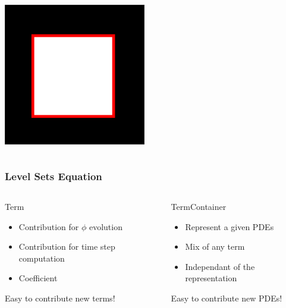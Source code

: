 \begin{frame}
\begin{columns}
{\begin{center}
 \includegraphics[width=0.8\textwidth]{../Art/MalcolmLayers.png}
\end{center}
}

\end{columns}

\end{frame}


\begin{frame}
\frametitle{Level Sets Equation}

\begin{columns}
  \begin{block}{Term}
    \begin{itemize}
      \item Contribution for $\phi$ evolution
      \item Contribution for time step computation
      \item Coefficient
    \end{itemize} 
  \alert<2>{Easy to contribute new terms!}
  \end{block}

  \begin{block}{TermContainer}
    \begin{itemize}
      \item Represent a given PDEs
      \item Mix of any term
      \item Independant of the representation
    \end{itemize}
  \alert<2>{Easy to contribute new PDEs!}
  \end{block}

\end{columns}

\end{frame}

